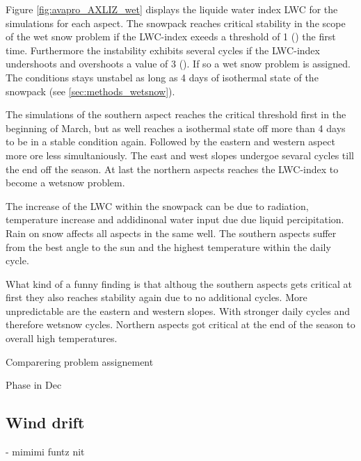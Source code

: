 \noindent Figure \ref{fig:avapro_AXLIZ_wet} displays the  liquide water index LWC for the simulations for each aspect. The snowpack
reaches critical stability in the scope of the wet snow problem if the LWC-index exeeds a threshold of 1 (\cite{mittererOperationalSupportingTool2013})
the first time. Furthermore the instability exhibits several cycles if the LWC-index undershoots and overshoots a value of 3 (\cite{mittererOperationalSupportingTool2013}).
If so a wet snow problem is assigned. The conditions stays unstabel as long as 4 days of isothermal state of the snowpack (see \ref{sec:methods_wetsnow}).

The simulations of the southern aspect reaches the critical threshold first in the beginning of March, but as well reaches a isothermal state off
more than 4 days to be in a stable condition again. Followed by the eastern and western aspect more ore less simultaniously. The east and west slopes
undergoe sevaral cycles till the end off the season. At last the northern aspects reaches the LWC-index to become a wetsnow problem. 

The increase of the LWC within the snowpack can be due to radiation, temperature increase and addidinonal water input due due liquid percipitation.
Rain on snow affects all aspects in the same well. The southern aspects suffer from the best angle to the sun and the highest temperature within the 
daily cycle. 

What kind of a funny finding is that althoug the southern aspects gets critical at first they also reaches stability again due to no additional cycles.
More unpredictable are the eastern and western slopes. With stronger daily cycles and therefore wetsnow cycles. Northern aspects got critical at the 
end of the season to overall high temperatures.

Comparering  problem assignement

Phase in Dec

\subsection{Wind drift}

- mimimi funtz nit 


